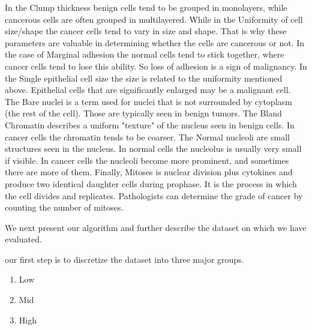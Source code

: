 \documentclass[11pt]{article}
\begin{document}
\vspace{.5 cm}
In the Clump thickness benign cells tend to be grouped in monolayers, while cancerous cells are often grouped in
multilayered. While in the Uniformity of cell size/shape the cancer cells tend to vary in size and shape. That is why these parameters are valuable in determining whether the cells are cancerous or not. In the case of Marginal adhesion the normal cells tend to stick together, where cancer cells tend to lose this ability. So loss of adhesion is a sign of malignancy. In the Single epithelial cell size the size is related to the uniformity
mentioned above. Epithelial cells that are significantly enlarged may be a malignant cell. The Bare nuclei is a term used for nuclei that is not surrounded by cytoplasm (the rest of the cell). Those are typically seen in benign tumors. The Bland Chromatin describes a uniform "texture" of the nucleus seen in benign cells. In cancer cells the chromatin tends to be coarser. The Normal nucleoli are small structures seen in the nucleus. In normal cells the nucleolus is usually very small if visible. In cancer cells the nucleoli become more prominent, and
sometimes there are more of them. Finally, Mitoses is nuclear division plus cytokines and produce two identical daughter cells during prophase. It is the process in which the cell divides and replicates. Pathologists can determine the grade of cancer by counting the number of mitoses.


We next present our algorithm and further describe the dataset on which we have evaluated.

our first step is to discretize the dataset into three major groups.
\begin{enumerate}
\item Low
\item Mid
\item High
\end{enumerate}
\end{document}
